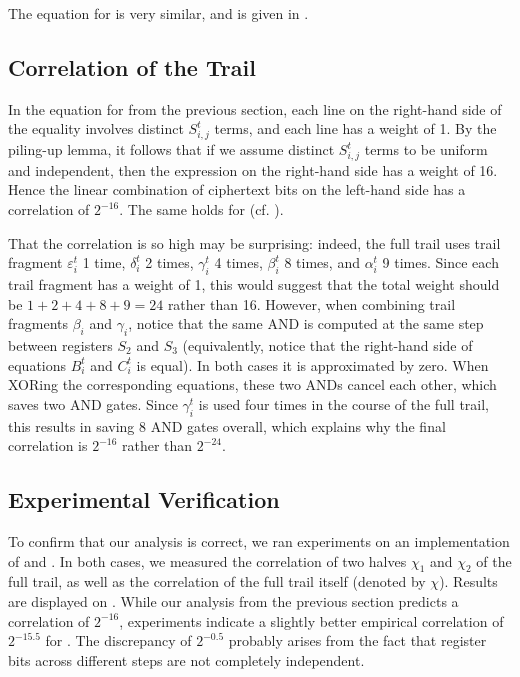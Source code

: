 The equation for \MiniMORUS[640] is very similar, and is given in .

\subsection{Correlation of the Trail}
\label{sec:minibias}

In the equation for \MiniMORUS[1280] from the previous section, each line on the right-hand side of the equality involves distinct $S^t_{i,j}$ terms, and each line has a weight of 1. By the piling-up lemma, it follows that if we assume distinct $S^t_{i,j}$ terms to be uniform and independent, then the expression on the right-hand side has a weight of 16. Hence the linear combination of ciphertext bits on the left-hand side has a correlation of $2^{-16}$. The same holds for \MiniMORUS[640] (cf. ).

That the correlation is so high may be surprising: indeed, the full trail uses trail fragment $\varepsilon^t_i$ 1 time, $\delta^t_i$ 2 times, $\gamma^t_i$ 4 times, $\beta^t_i$ 8 times, and $\alpha^t_i$ 9 times. Since each trail fragment has a weight of 1, this would suggest that the total weight should be $1+2+4+8+9 = 24$ rather than 16. However, when combining trail fragments $\beta_i$ and $\gamma_i$, notice that the same AND is computed at the same step between registers $S_2$ and $S_3$ (equivalently, notice that the right-hand side of equations $B^t_i$ and $C^t_i$ is equal). In both cases it is approximated by zero. When XORing the corresponding equations, these two ANDs cancel each other, which saves two AND gates. Since $\gamma^t_i$ is used four times in the course of the full trail, this results in saving 8 AND gates overall, which explains why the final correlation is $2^{-16}$ rather than $2^{-24}$.

\subsection{Experimental Verification}

To confirm that our analysis is correct, we ran experiments on an implementation of \MiniMORUS[1280] and \MiniMORUS[640]. In both cases, we measured the correlation of two halves $\chi_1$ and $\chi_2$ of the full trail, as well as the correlation of the full trail itself (denoted by $\chi$). Results are displayed on .
While our analysis from the previous section predicts a correlation of $2^{-16}$, experiments indicate a slightly better empirical correlation of $2^{-15.5}$ for \MORUS[640]. The discrepancy of $2^{-0.5}$ probably arises from the fact that register bits across different steps are not completely independent.

